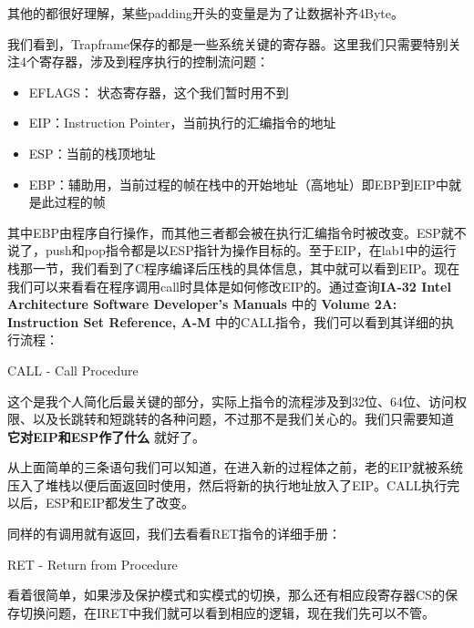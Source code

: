 \documentclass{article}
\newcommand{\highlight}[1]{{\bfseries \color{red}  #1}}
\begin{document}
\begin{CJK*}{UTF8}{gkai}
其他的都很好理解，某些padding开头的变量是为了让数据补齐4Byte。

我们看到，Trapframe保存的都是一些系统关键的寄存器。这里我们只需要特别关注4个寄存器，涉及到程序执行的控制流问题：

\begin{itemize}
\item{EFLAGS： 状态寄存器，这个我们暂时用不到}
\item{EIP：Instruction Pointer，当前执行的汇编指令的地址}
\item{ESP：当前的栈顶地址}
\item{EBP：辅助用，当前过程的帧在栈中的开始地址（高地址）即EBP到EIP中就是此过程的帧}
\end{itemize}

其中EBP由程序自行操作，而其他三者都会被在执行汇编指令时被改变。ESP就不说了，push和pop指令都是以ESP指针为操作目标的。至于EIP，在lab1中的运行栈那一节，我们看到了C程序编译后压栈的具体信息，其中就可以看到EIP。现在我们可以来看看在程序调用call时具体是如何修改EIP的。通过查询{\ttfamily \bfseries IA-32 Intel Architecture Software Developer's Manuals } 中的  {\ttfamily \bfseries Volume 2A: Instruction Set Reference, A-M } 中的CALL指令，我们可以看到其详细的执行流程：


\begin{algorithm}[htp]
\dontprintsemicolon
{}
\caption{CALL - Call Procedure}
\end{algorithm}

这个是我个人简化后最关键的部分，实际上指令的流程涉及到32位、64位、访问权限、以及长跳转和短跳转的各种问题，不过那不是我们关心的。我们只需要知道\highlight{它对EIP和ESP作了什么
}就好了。

从上面简单的三条语句我们可以知道，在进入新的过程体之前，老的EIP就被系统压入了堆栈以便后面返回时使用，然后将新的执行地址放入了EIP。CALL执行完以后，ESP和EIP都发生了改变。

同样的有调用就有返回，我们去看看RET指令的详细手册：

\begin{algorithm}[htp]
\dontprintsemicolon
{}
\caption{RET - Return from Procedure}
\end{algorithm}

看着很简单，如果涉及保护模式和实模式的切换，那么还有相应段寄存器CS的保存切换问题，在IRET中我们就可以看到相应的逻辑，现在我们先可以不管。

\vspace{4em}


\end{CJK*}
\end{document}
